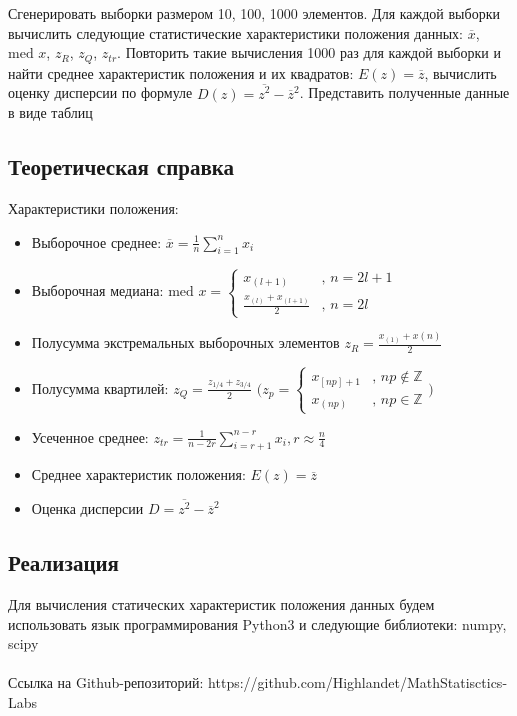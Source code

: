 \documentclass[14pt]{extarticle}
\begin{document}
Сгенерировать выборки размером 10, 100, 1000 элементов. Для каждой выборки вычислить следующие статистические характеристики положения данных: \(\overline{x}\), \(\text{med }x\), \(z_R\), \(z_Q\), \(z_{tr}\). Повторить такие вычисления 1000 раз для каждой выборки и найти среднее характеристик положения и их квадратов: \(E(z)=\overline{z}\), вычислить оценку дисперсии по формуле \(D(z)=\overline{z^2}-\overline{z}^2\). Представить полученные данные в виде таблиц

\subsection{Теоретическая справка}

Характеристики положения:
\begin{itemize}
    \item Выборочное среднее: \(\overline{x} = \frac{1}{n}\sum_{i=1}^n x_i\)
    \item Выборочная медиана: \(\text{med } x = \begin{cases}
    x_{(l+1)}&\text{, } n=2l+1 \\
    \frac{x_{(l)}+x_{(l+1)}}{2}&\text{, } n=2l\end{cases}\)
    \item Полусумма экстремальных выборочных элементов \(z_R=\frac{x_{(1)}+x{(n)}}{2}\)
    \item Полусумма квартилей: \(z_Q=\frac{z_{1/4}+z_{3/4}}{2}\)   \(\big(z_p=\begin{cases}
    x_{[np]+1}&\text{, } np\notin\mathbb{Z} \\
    x_{(np)}&\text{, } np\in\mathbb{Z}\end{cases}\big)\)
    \item Усеченное среднее: \(z_{tr}=\frac{1}{n-2r}\sum_{i=r+1}^{n-r} x_i, r\approx\frac{n}{4}\)
    \item Среднее характеристик положения: \(E(z)=\overline{z}\)
    \item Оценка дисперсии \(D=\overline{z^2}-\overline{z}^2\)
\end{itemize}

\subsection{Реализация}

Для вычисления статических характеристик положения данных будем использовать язык программирования Python3 и следующие библиотеки: numpy, scipy\\\\
Ссылка на Github-репозиторий: https://github.com/Highlandet/MathStatisctics-Labs
\end{document}
